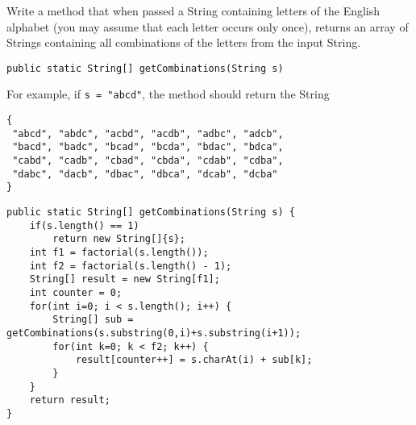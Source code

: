 \begin{questions}
Write a method that when passed a String containing letters of the English alphabet (you may assume that each letter occurs only once), returns an array of Strings containing all combinations of the letters from the input String.

\begin{lstlisting}
public static String[] getCombinations(String s)
\end{lstlisting} 

For example, if \texttt{s = "abcd"}, the method should return the String

\begin{verbatim}
{
 "abcd", "abdc", "acbd", "acdb", "adbc", "adcb", 
 "bacd", "badc", "bcad", "bcda", "bdac", "bdca", 
 "cabd", "cadb", "cbad", "cbda", "cdab", "cdba", 
 "dabc", "dacb", "dbac", "dbca", "dcab", "dcba"
}
\end{verbatim}

\ifprintanswers
\begin{lstlisting}
public static String[] getCombinations(String s) {
	if(s.length() == 1)
		return new String[]{s};
	int f1 = factorial(s.length());
	int f2 = factorial(s.length() - 1);
	String[] result = new String[f1];
	int counter = 0;
	for(int i=0; i < s.length(); i++) {
		String[] sub = getCombinations(s.substring(0,i)+s.substring(i+1));
		for(int k=0; k < f2; k++) {
			result[counter++] = s.charAt(i) + sub[k];
		}
	}
	return result;
}	
\end{lstlisting}
\else
\fi
	
\end{questions}

